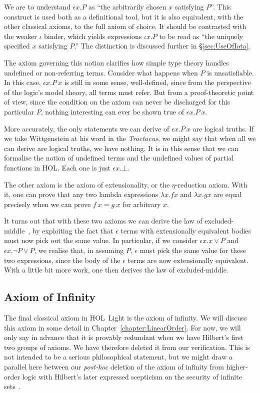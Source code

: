 We are to understand $\epsilon x. P$ as ``the arbitrarily chosen $x$ satisfying $P$''. This construct is used both as a definitional tool, but it is also equivalent, with the other classical axioms, to the full axiom of choice. It should be contrasted with the weaker $\iota$ binder, which yields expressions $\iota x. P$ to be read as ``the uniquely specified $x$ satisfying $P$.'' The distinction is discussed further in \S\ref{sec:UseOfIota}.

The axiom governing this notion clarifies how simple type theory handles undefined or non-referring terms. Consider what happens when $P$ is unsatisfiable. In this case, $\epsilon x. P\ x$ is still in some sense, well-defined, since from the perspective of the logic's model theory, all terms must refer. But from a proof-theoretic point of view, since the condition on the axiom can never be discharged for this particular $P$, nothing interesting can ever be shown true of $\epsilon x. P\ x$. 

More accurately, the only statements we can derive of $\epsilon x. P\ x$ are logical truths. If we take Wittgenstein at his word in the \emph{Tractacus}, we might say that when all we can derive are logical truths, we have nothing. It is in this sense that we can formalise the notion of undefined terms and the undefined values of partial functions in HOL. Each one is just $\epsilon x. \bot$.

The other axiom is the axiom of extensionality, or the $\eta$-reduction axiom. With it, one can prove that any two lambda expressions $\lambda x. f x$ and $\lambda x. g x$ are equal precisely when we can prove $f\ x = g\ x$ for arbitrary $x$.

It turns out that with these two axioms we can derive the law of excluded-middle~\cite{AxiomChoiceExcludedMiddle}, by exploiting the fact that $\epsilon$ terms with extensionally equivalent bodies must now pick out the same value. In particular, if we consider $\epsilon x. x \vee P$ and $\epsilon x. \neg P \vee P$, we realise that, in assuming $P$, $\epsilon$ must pick the same value for these two expressions, since the body of the $\epsilon$ terms are now extensionally equivalent. With a little bit more work, one then derives the law of excluded-middle.

\subsection{Axiom of Infinity}
The final classical axiom in HOL~Light is the axiom of infinity. We will discuss this axiom in some detail in Chapter~\ref{chapter:LinearOrder}. For now, we will only say in advance that it is provably redundant when we have Hilbert's first two groups of axioms. We have therefore deleted it from our verification. This is not intended to be a serious philosophical statement, but we might draw a parallel here between our \emph{post-hoc} deletion of the axiom of infinity from higher-order logic with Hilbert's later expressed scepticism on the security of infinite sets~\cite{OnInfinite}.

